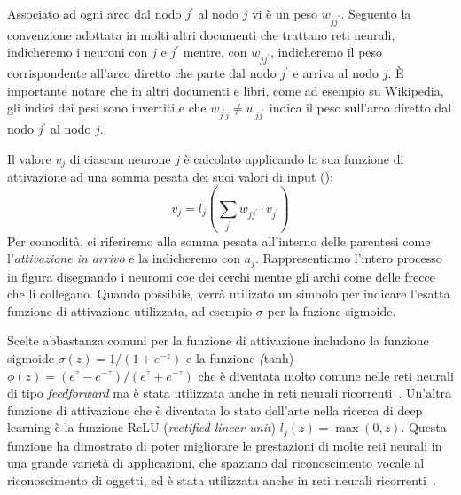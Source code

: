 Associato ad ogni arco dal nodo $j^{'}$ al nodo $j$ vi \`e un peso $w_{jj^{'}}$. Seguento la convenzione adottata in molti altri documenti che trattano reti neurali, indicheremo i neuroni con $j$ e $j^{'}$ mentre, con $w_{jj^{'}}$, indicheremo il peso corrispondente all'arco diretto che parte dal nodo $j^{'}$ e arriva al nodo $j$.
\`E importante notare che in altri documenti e libri, come ad esempio su Wikipedia, gli indici dei pesi sono invertiti e che $w_{j^{'}j} \neq w_{jj^{'}}$ indica il peso sull'arco diretto dal nodo $j^{'}$ al nodo $j$.

Il valore $v_j$ di ciascun neurone $j$ \`e calcolato applicando la sua funzione di attivazione ad una somma pesata dei suoi valori di input (): %
\begin{equation} %
  v_j = l_j\left( \sum_{j^{'}} w_{jj^{'}} \cdot v_{j^{'}} \right)
\end{equation}
Per comodit\`a, ci riferiremo alla somma pesata all'interno delle parentesi come l'\emph{attivazione in arrivo} e la indicheremo con $a_j$. Rappresentiamo l'intero processo in figura disegnando i neuromi coe dei cerchi mentre gli archi come delle frecce che li collegano.
Quando possibile, verr\`a utilizato un simbolo per indicare l'esatta funzione di attivazione utilizzata, ad esempio $\sigma$ per la fnzione sigmoide.

Scelte abbastanza comuni per la funzione di attivazione includono la funzione sigmoide $\sigma(z) = 1/(1+e^{-z})$ e la funzione \emph(tanh) $\phi(z)=(e^z-e^{-z})/(e^z+e^{-z})$ che \`e diventata molto comune nelle reti neurali di tipo \emph{feedforward} ma \`e stata utilizzata anche in reti neurali ricorrenti~\cite{Sutskever:2011}.
Un'altra funzione di attivazione che \`e diventata lo stato dell'arte nella ricerca di deep learning \`e la funzione ReLU (\emph{rectified linear unit}) $l_j(z)=\operatorname{max}(0, z)$.
Questa funzione ha dimostrato di poter migliorare le prestazioni di molte reti neurali in una grande variet\`a di applicazioni, che spaziano dal riconoscimento vocale al riconoscimento di oggetti, ed \`e stata utilizzata anche in reti neurali ricorrenti~\cite{Bengio:2013}.

